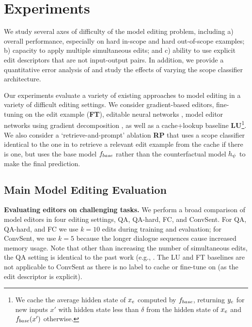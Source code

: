 \documentclass{article}
\begin{document}
\section{Experiments}
\label{sec:expts}
We study several axes of difficulty of the model editing problem, including a) overall performance, especially on hard in-scope and hard out-of-scope examples; b) capacity to apply multiple simultaneous edits; and c) ability to use explicit edit descriptors that are not input-output pairs. In addition, we provide a quantitative error analysis of {\name} and study the effects of varying the scope classifier architecture.

Our experiments evaluate a variety of existing approaches to model editing in a variety of difficult editing settings. We consider gradient-based editors, fine-tuning on the edit example (\textbf{FT}), editable neural networks \citep[\textbf{ENN};][]{Sinitsin2020Editable}, model editor networks using gradient decomposition \citep[\textbf{MEND};][]{mitchell2021fast}, as well as a cache+lookup baseline \textbf{LU}\footnote{We cache the average hidden state of $x_e$ computed by $f_{base}$, returning $\ye$ for new inputs $x'$ with hidden state less than $\delta$ from the hidden state of $x_e$ and $f_{base}(x')$ otherwise.}. We also consider a `retrieve-and-prompt' ablation \textbf{RP} that uses a scope classifier identical to the one in {\name} to retrieve a relevant edit example from the cache if there is one, but uses the base model $f_{base}$ rather than the counterfactual model $h_\psi$ to make the final prediction.



\subsection{Main Model Editing Evaluation}

\textbf{Evaluating editors on challenging tasks.}
We perform a broad comparison of model editors in four editing settings, QA, QA-hard, FC, and ConvSent. For QA, QA-hard, and FC we use $k=10$ edits during training and evaluation; for ConvSent, we use $k=5$ because the longer dialogue sequences cause increased memory usage. Note that other than increasing the number of simultaneous edits, the QA setting is identical to the past work (e.g., \citet{Cao2021EditingFK,mitchell2021fast}. The LU and FT baselines are not applicable to ConvSent as there is no label to cache or fine-tune on (as the edit descriptor is explicit).
\end{document}
